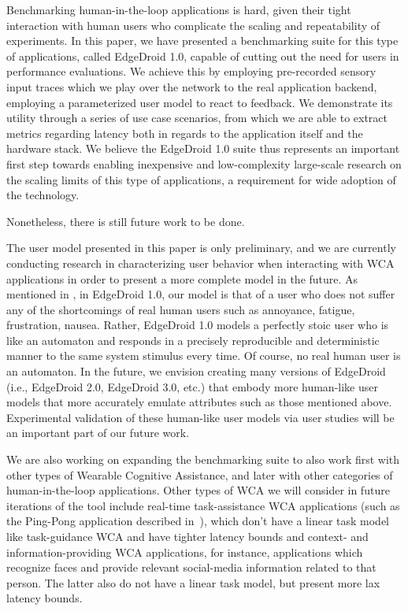 Benchmarking human-in-the-loop applications is hard, given their tight interaction with human users who complicate the scaling and repeatability of experiments.
In this paper, we have presented a benchmarking suite for this type of applications, called EdgeDroid 1.0, capable of cutting out the need for users in performance evaluations.
We achieve this by employing pre-recorded sensory input traces which we play over the network to the real application backend, employing a parameterized user model to react to feedback.
We demonstrate its utility through a series of use case scenarios, from which we are able to extract metrics regarding latency both in regards to the application itself and the hardware stack.
We believe the EdgeDroid 1.0 suite thus represents an important first step towards enabling inexpensive and low-complexity large-scale research on the scaling limits of this type of applications, a requirement for wide adoption of the technology.

Nonetheless, there is still future work to be done.

The user model presented in this paper is only preliminary, and we are currently conducting research in characterizing user behavior when interacting with WCA applications in order to present a more complete model in the future.
As mentioned in , in EdgeDroid 1.0, our model is that of a user who does not suffer any of the shortcomings of real human users such as annoyance, fatigue, frustration, nausea.
Rather, EdgeDroid 1.0 models a perfectly stoic user who is like an automaton and responds in a precisely reproducible and deterministic manner to the same system stimulus every time.
Of course, no real human user is an automaton.
In the future, we envision creating  many versions of EdgeDroid (i.e., EdgeDroid 2.0, EdgeDroid 3.0, etc.) that embody more human-like user models that more accurately emulate attributes such as those mentioned above.
Experimental validation of these human-like user models via user studies will be an important part of our future work.

We are also working on expanding the benchmarking suite to also work first with other types of Wearable Cognitive Assistance, and later with other categories of human-in-the-loop applications.
Other types of WCA we will consider in future iterations of the tool include real-time task-assistance WCA applications (such as the Ping-Pong application described in~\cite{Chen:EarlyImplementation}), which don't have a linear task model like task-guidance WCA and have tighter latency bounds and context- and information-providing WCA applications, for instance, applications which recognize faces and provide relevant social-media information related to that person.
The latter also do not have a linear task model, but present more lax latency bounds.

